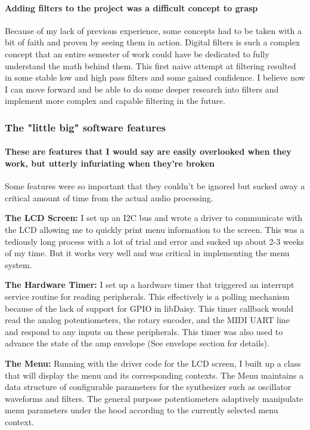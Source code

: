 \documentclass[acmlarge,screen]{acmart}
\begin{document}
	\paragraph{Adding filters to the project was a difficult concept to grasp} Because of my lack of previous experience, some concepts had to be taken with a bit of faith and proven by seeing them in action. Digital filters is such a complex concept that an entire semester of work could have be dedicated to fully understand the math behind them. This first naive attempt at filtering resulted in some stable low and high pass filters and some gained confidence. I believe now I can move forward and be able to do some deeper research into filters and implement more complex and capable filtering in the future.
	
	\subsubsection{The "little big" software features}
	\paragraph{These are features that I would say are easily overlooked when they work, but utterly infuriating when they're broken} Some features were so important that they couldn't be ignored but sucked away a critical amount of time from the actual audio processing.

	\textbf{The LCD Screen:} I set up an I2C bus and wrote a driver to communicate with the LCD allowing me to quickly print menu information to the screen. This was a tediously long process with a lot of trial and error and sucked up about 2-3 weeks of my time. But it works very well and was critical in implementing the menu system.

	\textbf{The Hardware Timer:} I set up a hardware timer that triggered an interrupt service routine for reading peripherals. This effectively is a polling mechanism because of the lack of support for GPIO  in libDaisy. This timer callback would read the analog potentiometers, the rotary encoder, and the MIDI UART line and respond to any inputs on these peripherals. This timer was also used to advance the state of the amp envelope (See envelope section for details).
	
	\textbf{The Menu:} Running with the driver code for the LCD screen, I built up a class that will display the menu and its corresponding contexts. The Menu maintains a data structure of configurable parameters for the synthesizer such as oscillator waveforms and filters. The general purpose potentiometers adaptively manipulate menu parameters under the hood according to the currently selected menu context.
	
\end{document}
